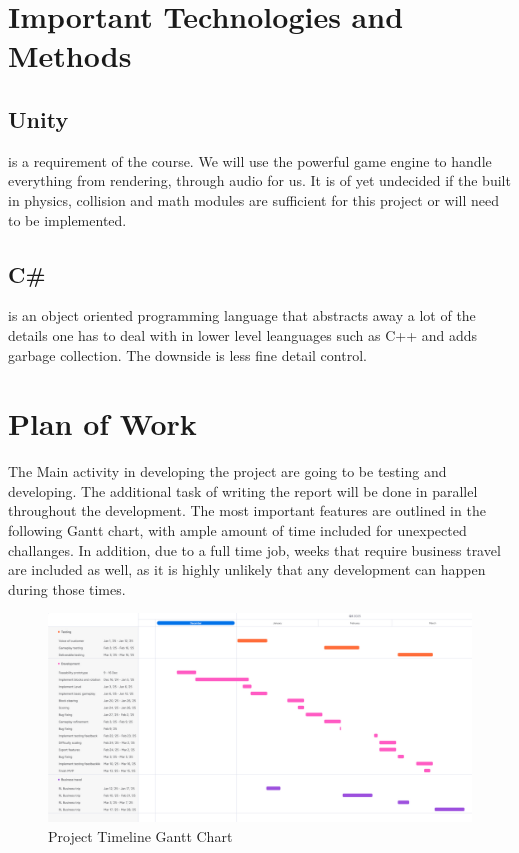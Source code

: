 \documentclass{article}
\begin{document}
\section{Important Technologies and Methods}
\subsection{Unity} is a requirement of the course. We will use the powerful game engine to handle everything from rendering, through audio for us. It is of yet undecided if the built in physics, collision and math modules are sufficient for this project or will need to be implemented.
\subsection{C\#} is an object oriented programming language that abstracts away a lot of the details one has to deal with in lower level leanguages such as C++ and adds garbage collection. The downside is less fine detail control.


\section{Plan of Work}

The Main activity in developing the project are going to be testing and developing. The additional task of writing the report will be done in parallel throughout the development. The most important features are outlined in the following Gantt chart, with ample amount of time included for unexpected challanges.
In addition, due to a full time job, weeks that require business travel are included as well, as it is highly unlikely that any development can happen during those times.

\begin{figure}[H]
    \centering
    \includegraphics[width=\textwidth]{gantt.png}
    \caption{Project Timeline Gantt Chart}
    \label{fig:gantt}
\end{figure}
\end{document}
